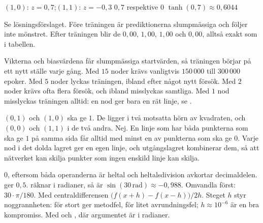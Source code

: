 \begin{facit}
  $(1, 0)$: $z = 0{,}7$;\enspace $(1, 1)$: $z = -0{,}3$
 $0{,}7$ respektive $0$  $\tanh(0{,}7) \approx 0{,}6044$

  Se lösningsförslaget.
 Före träningen är prediktionerna slumpmässiga och följer inte mönstret. Efter träningen
blir de $0{,}00$, $1{,}00$, $1{,}00$ och $0{,}00$, alltså exakt som i tabellen.

  Vikterna och biasvärdena får slumpmässiga startvärden, så träningen börjar på
ett nytt ställe varje gång. Med $15$ noder krävs vanligtvis $150\,000$ till $300\,000$ epoker.
 Med $5$ noder lyckas träningen, ibland efter något nytt försök. Med $2$ noder krävs ofta
flera försök, och ibland misslyckas samtliga. Med $1$ nod misslyckas träningen alltid: en nod ger
bara en rät linje, se .

  $(0, 1)$ och $(1, 0)$ ska ge $1$. De ligger i två motsatta hörn av kvadraten,
och $(0, 0)$ och $(1, 1)$ i de två andra.
 Nej. En linje som har båda punkterna som ska ge $1$ på samma sida får alltid med minst en av
punkterna som ska ge $0$. Varje nod i det dolda lagret ger en egen linje, och utgångslagret
kombinerar dem, så att nätverket kan skilja punkter som ingen enskild linje kan skilja.

  $0$, eftersom båda operanderna är heltal och heltalsdivision
avkortar decimaldelen.  ger $0{,}5$.
  räknar i radianer, så  är $\sin(30\,\text{rad}) \approx
-0{,}988$. Omvandla först: $30 \cdot \pi/180$.
 Med centraldifferensen $\bigl(f(x + h) - f(x - h)\bigr)/2h$. Steget $h$ styr noggrannheten:
för stort ger metodfel, för litet avrundningsfel; $h \approx 10^{-6}$ är en bra kompromiss.
 Med  och , där argumentet är i radianer.

\end{facit}
